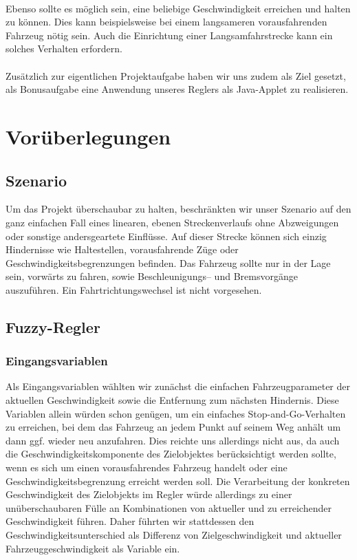 \documentclass[10pt,a4paper]{article}
\begin{document}
\paragraph{}
Ebenso sollte es möglich sein, eine beliebige Geschwindigkeit erreichen und halten zu können. Dies kann beispielsweise bei einem langsameren vorausfahrenden Fahrzeug nötig sein. Auch die Einrichtung einer Langsamfahrstrecke kann ein solches Verhalten erfordern.
\paragraph{}
Zusätzlich zur eigentlichen Projektaufgabe haben wir uns zudem als Ziel gesetzt, als Bonusaufgabe eine Anwendung unseres Reglers als Java-Applet zu realisieren.

\section{Vorüberlegungen}
\subsection{Szenario}

Um das Projekt überschaubar zu halten, beschränkten wir unser Szenario auf den ganz einfachen Fall eines linearen, ebenen Streckenverlaufs ohne Abzweigungen oder sonstige andersgeartete Einflüsse. Auf dieser Strecke können sich einzig Hindernisse wie Haltestellen, vorausfahrende Züge oder Geschwindigkeitsbegrenzungen befinden. Das Fahrzeug sollte nur in der Lage sein, vorwärts zu fahren, sowie Beschleunigungs-- und Bremsvorgänge auszuführen. Ein Fahrtrichtungswechsel ist nicht vorgesehen.

\subsection{Fuzzy-Regler}

\subsubsection{Eingangsvariablen}
Als Eingangsvariablen wählten wir zunächst die einfachen Fahrzeugparameter der aktuellen Geschwindigkeit sowie die Entfernung zum nächsten Hindernis. Diese Variablen allein würden schon genügen, um ein einfaches Stop-and-Go-Verhalten zu erreichen, bei dem das Fahrzeug an jedem Punkt auf seinem Weg anhält um dann ggf. wieder neu anzufahren.
\newline
Dies reichte uns allerdings nicht aus, da auch die Geschwindigkeitskomponente des Zielobjektes berücksichtigt werden sollte, wenn es sich um einen vorausfahrendes Fahrzeug handelt oder eine Geschwindigkeitsbegrenzung erreicht werden soll.
Die Verarbeitung der konkreten Geschwindigkeit des Zielobjekts im Regler würde allerdings zu einer unüberschaubaren Fülle an Kombinationen von aktueller und zu erreichender Geschwindigkeit führen. Daher führten wir stattdessen den Geschwindigkeitsunterschied als Differenz von Zielgeschwindigkeit und aktueller Fahrzeuggeschwindigkeit als Variable ein.
\end{document}
